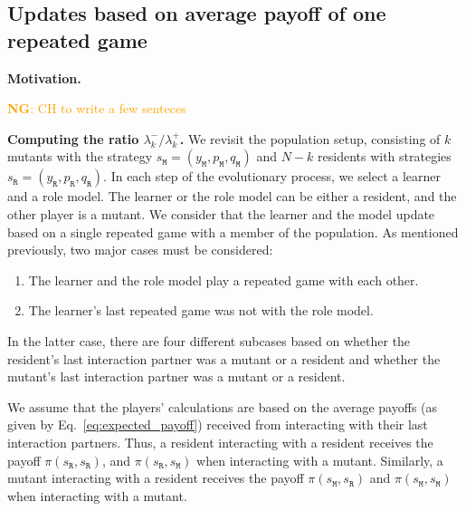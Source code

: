 \documentclass[11pt]{article}
\newcommand{\nikoleta}[1]{\textcolor{orange}{\textbf{NG}: #1}}
\def\resident{\texttt{R}}
\def\mutant{\texttt{M}}
\def\strategy{s}
\theoremstyle{plainCl1}
\theoremstyle{plainCl2}
\begin{document}

\subsection{Updates based on average payoff of one repeated game}\label{section:one_interaction_full_memory}


{\bf Motivation.}

\nikoleta{CH to write a few senteces}


\noindent
{\bf Computing the ratio $\lambda^-_k/\lambda^+_k$.}
We revisit the population setup, consisting of \(k\) mutants with the strategy
\(\strategy_\mutant = (y_\mutant, p_\mutant, q_\mutant)\) and \(N-k\) residents
with strategies \(\strategy_\resident = (y_\resident, p_\resident,
q_\resident)\). In each step of the evolutionary process, we select a learner and
a role model. The learner or the role model can be either a resident, and the
other player is a mutant. We consider that the learner and the
model update based on a single repeated game with a member of the population.
As mentioned previously, two major cases must be considered:

\begin{enumerate}
  \item The learner and the role model play a repeated game with each other.
  \item The learner's last repeated game was not with the role model.
\end{enumerate}

In the latter case, there are four different subcases based on whether the
resident's last interaction partner was a mutant or a resident and whether the
mutant's last interaction partner was a mutant or a resident.

We assume that the players' calculations are based on the average payoffs (as given by
Eq.~\eqref{eq:expected_payoff})
received from interacting with their last interaction partners. Thus, a resident
interacting with a resident receives the payoff $\pi(\strategy_\resident, \strategy_\resident)$,
and $\pi(\strategy_\resident, \strategy_\mutant)$ when interacting with a mutant. Similarly, a
mutant interacting with a resident receives the payoff $\pi(\strategy_\mutant,
\strategy_\resident)$ and $\pi(\strategy_\mutant, \strategy_\mutant)$ when interacting with a mutant.\\
\end{document}
